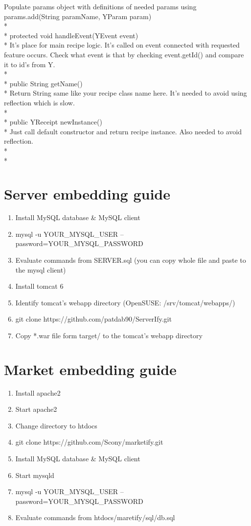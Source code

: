 \documentclass[11pt,a4paper,polish,thesis]{dcsbook}
\begin{document}
Populate params object with definitions of needed params using params.add(String paramName, YParam param)\\*\\*
protected void handleEvent(YEvent event)\\*
It's place for main recipe logic. It's called on event connected with requested feature occurs. Check what event is that by checking event.getId() and compare it to id's from Y.\\*\\*
public String getName()\\*
Return String same like your recipe class name here. It's needed to avoid using reflection which is slow.\\*\\*
public YReceipt newInstance()\\*
Just call default constructor and return recipe instance. Also needed to avoid reflection.\\*\\*

\chapter{Server embedding guide}
\begin{enumerate}
\item Install MySQL database \& MySQL client
\item mysql -u YOUR\_MYSQL\_USER --password=YOUR\_MYSQL\_PASSWORD
\item Evaluate commands from SERVER.sql (you can copy whole file and paste to the mysql client)
\item Install tomcat 6
\item Identify tomcat's webapp directory (OpenSUSE: /srv/tomcat/webapps/)
\item git clone https://github.com/patdab90/ServerIfy.git
\item Copy *.war file form target/ to the tomcat's webapp directory
\end{enumerate}

\chapter{Market embedding guide}
\begin{enumerate}
\item Install apache2
\item Start apache2
\item Change directory to htdocs
\item git clone https://github.com/Scony/marketify.git
\item Install MySQL database \& MySQL client
\item Start mysqld
\item mysql -u YOUR\_MYSQL\_USER --password=YOUR\_MYSQL\_PASSWORD
\item Evaluate commands from htdocs/maretify/sql/db.sql
\end{enumerate}
\end{document}
